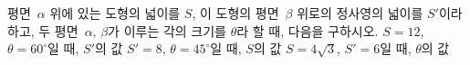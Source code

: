 평면~$\alpha$ 위에 있는 도형의 넓이를 $S$, 이 도형의 평면~$\beta$ 위로의 정사영의 넓이를 $S'$이라 하고, 두 평면~$\alpha$, $\beta$가 이루는 각의 크기를 $\theta$라 할 때, 다음을 구하시오.
 $S=12$, $\theta=60^\circ$일 때, $S'$의 값
 $S'=8$, $\theta=45^\circ$일 때, $S$의 값
 $S=4\sqrt{3}$, $S'=6$일 때, $\theta$의 값
